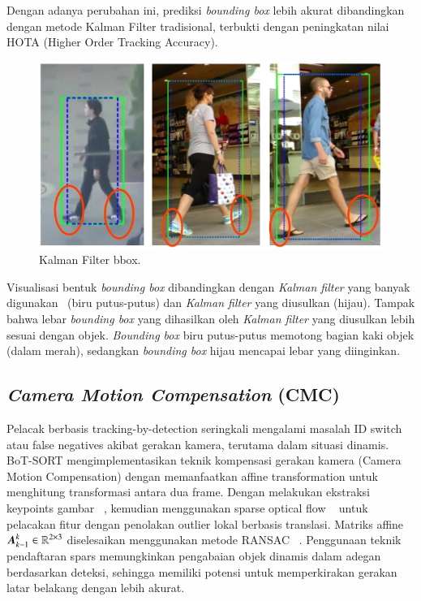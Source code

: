 Dengan adanya perubahan ini, prediksi \emph{bounding box} lebih akurat dibandingkan dengan metode Kalman Filter tradisional, terbukti dengan peningkatan nilai HOTA (Higher Order Tracking Accuracy).

\begin{figure}[H]
  \centering
  \includegraphics[scale=0.3]{gambar/KF_width.png}
  \caption{Kalman Filter bbox.}
  \label{fig:KF width}
\end{figure}

Visualisasi bentuk \emph{bounding box} dibandingkan dengan \emph{Kalman filter} yang banyak digunakan~\parencite{wojke2017simple} (biru putus-putus) dan \emph{Kalman filter} yang diusulkan (hijau). Tampak bahwa lebar \emph{bounding box} yang dihasilkan oleh \emph{Kalman filter} yang diusulkan lebih sesuai dengan objek. \emph{Bounding box} biru putus-putus memotong bagian kaki objek (dalam merah), sedangkan \emph{bounding box} hijau mencapai lebar yang diinginkan.

\subsection{\emph{Camera Motion Compensation} (CMC)}

Pelacak berbasis tracking-by-detection seringkali mengalami masalah ID switch atau false negatives akibat gerakan kamera, terutama dalam situasi dinamis. BoT-SORT mengimplementasikan teknik kompensasi gerakan kamera (Camera Motion Compensation) dengan memanfaatkan affine transformation untuk menghitung transformasi antara dua frame. Dengan melakukan ekstraksi keypoints gambar ~\cite{shi1994good}, kemudian menggunakan sparse optical flow ~\cite{Bouguet1999PyramidalIO} untuk pelacakan fitur dengan penolakan outlier lokal berbasis translasi. Matriks affine $\vb*{A}_{k-1}^k\in \mathbb{R}^{2 \times 3}$ diselesaikan menggunakan metode RANSAC ~\cite{fischler1981random}. Penggunaan teknik pendaftaran spars memungkinkan pengabaian objek dinamis dalam adegan berdasarkan deteksi, sehingga memiliki potensi untuk memperkirakan gerakan latar belakang dengan lebih akurat.

